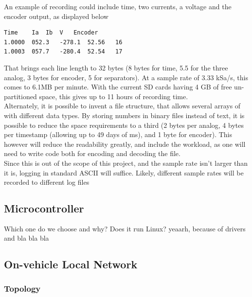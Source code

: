 An example of recording could include time, two currents, a voltage and the encoder output, as displayed below
\begin{lstlisting}
Time	Ia	Ib	V	Encoder
1.0000	052.3	-278.1	52.56	16
1.0003	057.7	-280.4	52.54	17
\end{lstlisting}
That brings each line length to 32 bytes (8 bytes for time, 5.5 for the three analog, 3 bytes for encoder, 5 for separators).
At a sample rate of 3.33 kSa/s, this comes to 6.1MB per minute. 
With the current SD cards having 4 GB of free un-partitioned space, this gives up to 11 hours of recording time.\\

Alternately, it is possible to invent a file structure, that allows several arrays of with different data types.
By storing numbers in binary files instead of text, it is possible to reduce the space requirements to a third (2 bytes per analog, 4 bytes per timestamp (allowing up to 49 days of ms), and 1 byte for encoder).
This however will reduce the readability greatly, and include the workload, as one will need to write code both for encoding and decoding the file. \\

Since this is out of the scope of this project, and the sample rate isn't larger than it is, logging in standard ASCII will suffice.
Likely, different sample rates will be recorded to different log files












\subsection{Microcontroller}
Which one do we choose and why?
Does it run Linux? yeaarh, because of drivers and bla bla bla















\subsection{On-vehicle Local Network}

\subsubsection{Topology}

